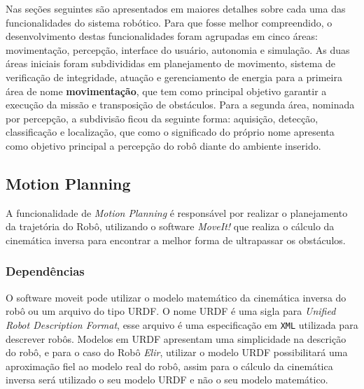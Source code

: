Nas seções seguintes são apresentados em maiores detalhes sobre cada uma das funcionalidades do sistema robótico. Para que fosse melhor compreendido, o desenvolvimento destas funcionalidades foram agrupadas em cinco áreas: movimentação, percepção, interface do usuário, autonomia e simulação. As duas áreas iniciais foram subdivididas em planejamento de movimento, sistema de verificação de integridade, atuação e gerenciamento de energia para a primeira área de nome \textbf{movimentação}, que tem como principal objetivo garantir a execução da missão e transposição de obstáculos. Para a segunda área, nominada por percepção, a subdivisão ficou da seguinte forma: aquisição, detecção, classificação e localização, que como o significado do próprio nome apresenta como objetivo principal a percepção do robô diante do ambiente inserido.




\subsection{Motion Planning}
\label{ssec:motion}
A funcionalidade de \textit{Motion Planning} é responsável por realizar o planejamento da trajetória do Robô, utilizando o software \textit{MoveIt!} que realiza o cálculo da cinemática inversa para encontrar a melhor forma de ultrapassar os obstáculos.
\subsubsection{Dependências}
O software moveit pode utilizar o modelo matemático da cinemática inversa do robô ou um arquivo do tipo URDF.
O nome URDF é uma sigla para \textit{Unified Robot Description Format}, esse arquivo é uma especificação em \verb|XML| utilizada para descrever robôs. Modelos em URDF apresentam uma simplicidade na descrição do robô, e para o caso do Robô \textit{Elir}, utilizar o modelo URDF possibilitará uma aproximação fiel ao modelo real do robô, assim para o cálculo da cinemática inversa será utilizado o seu modelo URDF e não o seu modelo matemático.

